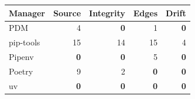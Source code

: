 \begin{tabular}{lrrrr}
\toprule
Manager & Source & Integrity & Edges & Drift \\
\midrule
PDM & 4 & \textbf{0} & 1 & \textbf{0} \\
pip-tools & 15 & 14 & 15 & 4 \\
Pipenv & \textbf{0} & \textbf{0} & 5 & \textbf{0} \\
Poetry & 9 & 2 & \textbf{0} & \textbf{0} \\
uv & \textbf{0} & \textbf{0} & \textbf{0} & \textbf{0} \\
\bottomrule
\end{tabular}
